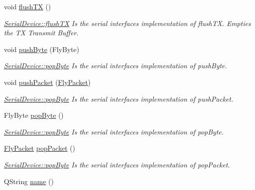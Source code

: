 \begin{DoxyCompactItemize}
void \hyperlink{class_serial_device_a56d7c575161fd216821d06e25f37106c}{flush\+TX} ()
\begin{DoxyCompactList}\small\item\em \hyperlink{class_serial_device_a56d7c575161fd216821d06e25f37106c}{Serial\+Device\+::flush\+TX} Is the serial interface\textquotesingle{}s implementation of flush\+TX. Empties the TX Transmit Buffer. \end{DoxyCompactList}\item 
void \hyperlink{class_serial_device_a8ae456ccffcf8afccdfe49357aed3e06}{push\+Byte} (Fly\+Byte)
\begin{DoxyCompactList}\small\item\em \hyperlink{class_serial_device_aa48df17f28ab9f613ba07181487a39c9}{Serial\+Device\+::pop\+Byte} Is the serial interface\textquotesingle{}s implementation of push\+Byte. \end{DoxyCompactList}\item 
void \hyperlink{class_serial_device_a35408d01afb4c48bc259dc601d2b0bf7}{push\+Packet} (\hyperlink{class_fly_packet}{Fly\+Packet})
\begin{DoxyCompactList}\small\item\em \hyperlink{class_serial_device_aa48df17f28ab9f613ba07181487a39c9}{Serial\+Device\+::pop\+Byte} Is the serial interface\textquotesingle{}s implementation of push\+Packet. \end{DoxyCompactList}\item 
Fly\+Byte \hyperlink{class_serial_device_aa48df17f28ab9f613ba07181487a39c9}{pop\+Byte} ()
\begin{DoxyCompactList}\small\item\em \hyperlink{class_serial_device_aa48df17f28ab9f613ba07181487a39c9}{Serial\+Device\+::pop\+Byte} Is the serial interface\textquotesingle{}s implementation of pop\+Byte. \end{DoxyCompactList}\item 
\hyperlink{class_fly_packet}{Fly\+Packet} \hyperlink{class_serial_device_ac581710eb5e03945d9b3de9d39be51fc}{pop\+Packet} ()
\begin{DoxyCompactList}\small\item\em \hyperlink{class_serial_device_aa48df17f28ab9f613ba07181487a39c9}{Serial\+Device\+::pop\+Byte} Is the serial interface\textquotesingle{}s implementation of pop\+Packet. \end{DoxyCompactList}\item 
Q\+String \hyperlink{class_serial_device_a97092ec9379ed561866dad21475ea331}{name} ()

\end{DoxyCompactItemize}
